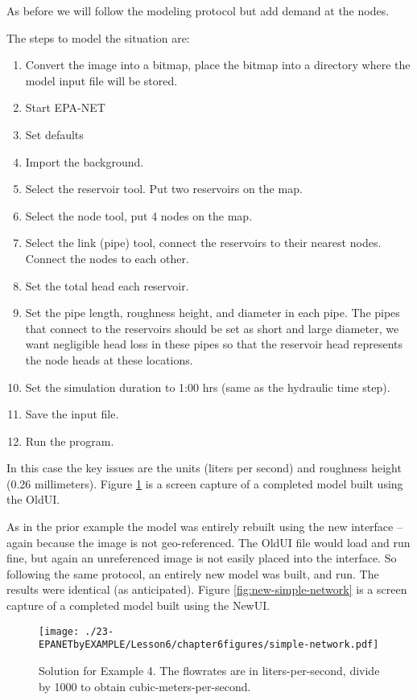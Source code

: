 As before we will follow the modeling protocol but add demand at the nodes.

The steps to model the situation are:
\begin{enumerate}
\item Convert the image into a bitmap, place the bitmap into a directory where the model input file will be stored.
\item Start EPA-NET
\item Set defaults
\item Import the background.
\item Select the reservoir tool.  Put two reservoirs on the map.
\item Select the node tool, put 4 nodes on the map.
\item Select the link (pipe) tool, connect the reservoirs to their nearest nodes.  Connect the nodes to each other.  
\item Set the total head each reservoir.
\item Set the pipe length, roughness height, and diameter in each pipe.  The pipes that connect to the reservoirs should be set as short and large diameter, we want negligible head loss in these pipes so that the reservoir head represents the node heads at these locations.
\item Set the simulation duration to 1:00 hrs (same as the hydraulic time step).
\item Save the input file.
\item Run the program.   
\end{enumerate}

In this case the key issues are the units (liters per second) and roughness height (0.26 millimeters).   
Figure \ref{fig:simple-network} is a screen capture of a completed model built using the OldUI.

As in the prior example the model was entirely rebuilt using the new interface -- again because the image is not geo-referenced.   The OldUI file would load and run fine, but again an unreferenced image is not easily placed into the interface.
So following the same protocol, an entirely new model was built, and run.
The results were identical (as anticipated).
Figure \ref{fig:new-simple-network} is a screen capture of a completed model built using the NewUI.

\begin{figure}[h!] %
   \centering
   \texttt{[image: ./23-EPANETbyEXAMPLE/Lesson6/chapter6figures/simple-network.pdf]} 
   \caption{Solution for Example 4.  The flowrates are in liters-per-second, divide by 1000 to obtain cubic-meters-per-second.}
   \label{fig:simple-network}
\end{figure}


